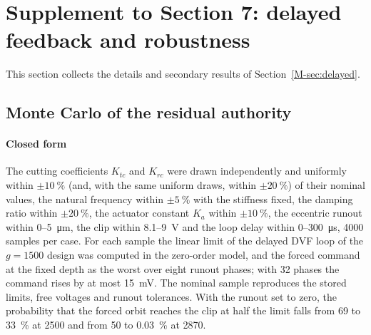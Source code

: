 \section{Supplement to Section 7: delayed feedback and robustness}\label{supp:delayed}

This section collects the details and secondary results of Section~\ref{M-sec:delayed}.

\subsection{Monte Carlo of the residual authority}\label{supp:mc}

\paragraph{Closed form} The cutting coefficients $K_{tc}$ and $K_{rc}$ were drawn independently and uniformly within $\pm\SI{10}{\percent}$ (and, with the same uniform draws, within $\pm\SI{20}{\percent}$) of their nominal values, the natural frequency within $\pm\SI{5}{\percent}$ with the stiffness fixed, the damping ratio within $\pm\SI{20}{\percent}$, the actuator constant $K_a$ within $\pm\SI{10}{\percent}$, the eccentric runout within 0--\SI{5}{\micro\metre}, the clip within 8.1--\SI{9}{\volt} and the loop delay within 0--\SI{300}{\micro\second}, 4000 samples per case. For each sample the linear limit of the delayed DVF loop of the $g=1500$ design was computed in the zero-order model, and the forced command at the fixed depth as the worst over eight runout phases; with 32 phases the command rises by at most \SI{15}{\milli\volt}. The nominal sample reproduces the stored limits, free voltages and runout tolerances. With the runout set to zero, the probability that the forced orbit reaches the clip at half the limit falls from 69 to \SI{33}{\percent} at \SI{2500}{\rpm} and from 50 to \SI{0.03}{\percent} at \SI{2870}{\rpm}.

